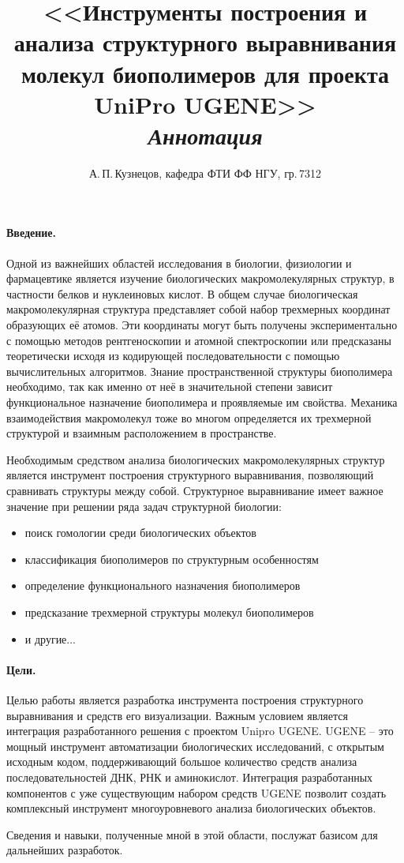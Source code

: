 \documentclass[a4paper, 11pt, utf8]{article}
\author{А.\,П.\,Кузнецов, кафедра ФТИ ФФ НГУ, гр.\,7312}
\title{<<Инструменты построения и анализа структурного выравнивания молекул биополимеров для проекта UniPro UGENE>>\\\itshape Аннотация}
\date{}
\begin{document}
\maketitle
\thispagestyle{empty}

\paragraph{Введение.}
Одной из важнейших областей исследования в биологии, физиологии и фармацевтике является изучение биологических макромолекулярных структур, в частности белков и нуклеиновых кислот. В общем случае биологическая макромолекулярная структура представляет собой набор трехмерных координат образующих её атомов. Эти координаты могут быть получены экспериментально с помощью методов рентгеноскопии и атомной спектроскопии или предсказаны теоретически исходя из кодирующей последовательности с помощью вычислительных алгоритмов. Знание пространственной структуры биополимера необходимо, так как именно от неё в значительной степени зависит функциональное назначение биополимера и проявляемые им свойства. Механика взаимодействия макромолекул тоже во многом определяется их трехмерной структурой и взаимным расположением в пространстве.  

Необходимым средством анализа биологических макромолекулярных структур является инструмент построения структурного выравнивания, позволяющий сравнивать структуры между собой. Структурное выравнивание имеет важное значение при решении ряда задач структурной биологии:
\begin{itemize}
    \item поиск гомологии среди биологических объектов
    \item классификация биополимеров  по структурным особенностям
    \item определение функционального назначения биополимеров
    \item предсказание трехмерной структуры молекул биополимеров 
    \item и другие...
\end{itemize}

\paragraph{Цели.}
Целью работы является разработка инструмента построения структурного выравнивания и средств его визуализации. Важным условием является интеграция разработанного решения с проектом Unipro UGENE. UGENE -- это мощный инструмент автоматизации биологических исследований, с открытым исходным кодом, поддерживающий большое количество средств анализа последовательностей ДНК, РНК и аминокислот. Интеграция разработанных компонентов с уже существующим набором средств  UGENE позволит создать комплексный инструмент многоуровневого анализа биологических объектов. 

Сведения и навыки, полученные мной в этой области, послужат базисом для дальнейших разработок.
\end{document}
